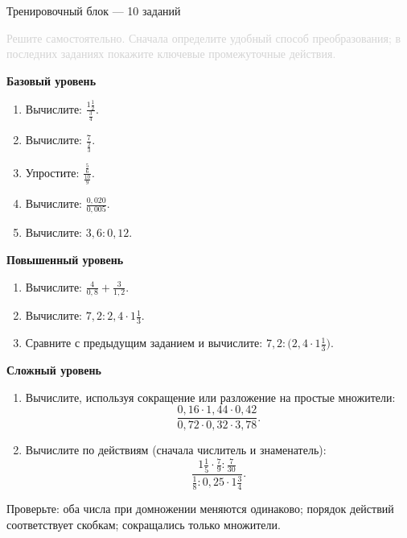 \documentclass[a4paper,12pt]{article}
\newcommand{\sectionhead}[1]{%
  \needspace{4\baselineskip}
  \vspace{0.9\baselineskip}
  {\large\color{darkaccent}#1\par}
  \vspace{2pt}{\color{accent}\hrule height .5pt}\vspace{6pt}
}
\begin{document}
\sectionhead{Тренировочный блок --- 10 заданий}
\textcolor{lightgray}{Решите самостоятельно. Сначала определите удобный способ преобразования; в последних заданиях покажите ключевые промежуточные действия.}
\par\vspace{5mm}
\textbf{Базовый уровень}\par
\begin{enumerate}[label=\textcolor{accent}{\arabic*.},itemsep=9pt]
\item Вычислите: $\displaystyle\frac{1\frac12}{\frac34}$.
\item Вычислите: $\displaystyle\frac7{\frac23}$.
\item Упростите: $\displaystyle\frac{\frac56}{\frac{10}{9}}$.
\item Вычислите: $\displaystyle\frac{0{,}020}{0{,}005}$.
\item Вычислите: $\displaystyle3{,}6:0{,}12$.
\end{enumerate}
\vspace{4mm}
\textbf{Повышенный уровень}\par
\begin{enumerate}[label=\textcolor{accent}{\arabic*.},start=6,itemsep=10pt]
\item Вычислите: $\displaystyle\frac4{0{,}8}+\frac3{1{,}2}$.
\item Вычислите: $\displaystyle7{,}2:2{,}4\cdot1\frac13$.
\item Сравните с предыдущим заданием и вычислите: $\displaystyle7{,}2:\bigl(2{,}4\cdot1\frac13\bigr)$.
\end{enumerate}
\vspace{4mm}
\textbf{Сложный уровень}\par
\begin{enumerate}[label=\textcolor{accent}{\arabic*.},start=9,itemsep=12pt]
\item Вычислите, используя сокращение или разложение на простые множители:
\[\frac{0{,}16\cdot1{,}44\cdot0{,}42}{0{,}72\cdot0{,}32\cdot3{,}78}.\]
\item Вычислите по действиям (сначала числитель и знаменатель):
\[\frac{\displaystyle 1\frac15\cdot\frac79:\frac7{30}}
{\displaystyle \frac18:0{,}25\cdot1\frac34}.\]
\end{enumerate}
\vfill
{\small\color{lightgray} Проверьте: оба числа при домножении меняются одинаково; порядок действий соответствует скобкам; сокращались только множители.}
\clearpage
\end{document}
